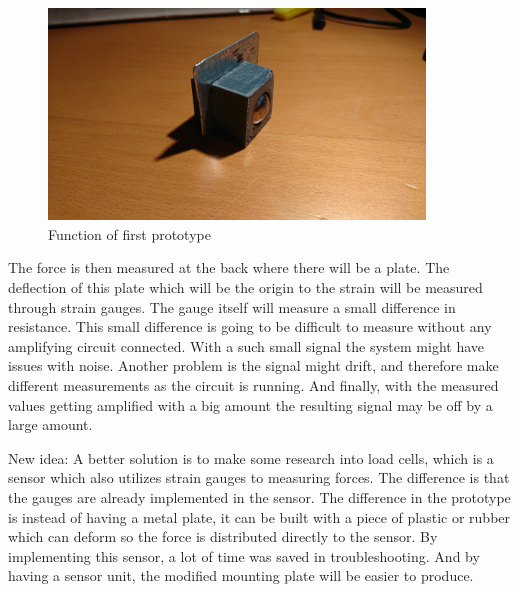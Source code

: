 \begin{figure}[H]%
\begin{center}
	\includegraphics[width = 10cm]{Figures/Press_sens_prot_1.png}
	\caption{Function of first prototype}
	\label{Press_sens_prot_1}
\end{center}
\end{figure}
 The force is then measured at the back where there will be a plate. The deflection of this plate which will be the origin to the strain will be measured through strain gauges. 
The gauge itself will measure a small difference in resistance. This small difference is going to be difficult to measure without any amplifying circuit connected. With a such small signal the system might have issues with noise. Another problem is the signal might drift, and therefore make different measurements as the circuit is running. And finally, with the measured values getting amplified with a big amount the resulting signal may be off by a large amount. 

New idea:
A better solution is to make some research into load cells, which is a sensor which also utilizes strain gauges to measuring forces. The difference is that the gauges are already implemented in the sensor. The difference in the prototype is instead of having a metal plate, it can be built with a piece of plastic or rubber which can deform so the force is distributed directly to the sensor. By implementing this sensor, a lot of time was saved in troubleshooting. And by having a sensor unit, the modified mounting plate will be easier to produce. 
 
